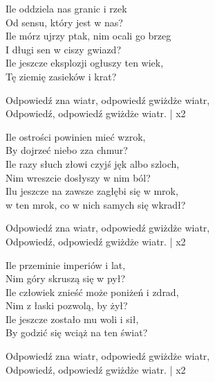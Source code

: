 \begin{text}
    Ile oddziela nas granic i rzek\\
    Od sensu, który jest w nas?\\
    Ile mórz ujrzy ptak, nim ocali go brzeg\\
    I długi sen w ciszy gwiazd?\\
    Ile jeszcze eksplozji ogłuszy ten wiek,\\
    Tę ziemię zasieków i krat?

    \vin Odpowiedź zna wiatr, odpowiedź gwiżdże wiatr,\\
    \vin Odpowiedź, odpowiedź gwiżdże wiatr. | x2

    Ile ostrości powinien mieć wzrok,\\
    By dojrzeć niebo zza chmur?\\
    Ile razy słuch złowi czyjś jęk albo szloch,\\
    Nim wreszcie dosłyszy w nim ból?\\
    Ilu jeszcze na zawsze zagłębi się w mrok,\\
    w ten mrok, co w nich samych się wkradł?

    \vin Odpowiedź zna wiatr, odpowiedź gwiżdże wiatr,\\
    \vin Odpowiedź, odpowiedź gwiżdże wiatr. | x2

    Ile przeminie imperiów i lat,\\
    Nim góry skruszą się w pył?\\
    Ile człowiek znieść może poniżeń i zdrad,\\
    Nim z łaski pozwolą, by żył?\\
    Ile jeszcze zostało mu woli i sił,\\
    By godzić się wciąż na ten świat?

    \vin Odpowiedź zna wiatr, odpowiedź gwiżdże wiatr,\\
    \vin Odpowiedź, odpowiedź gwiżdże wiatr. | x2

\end{text}
